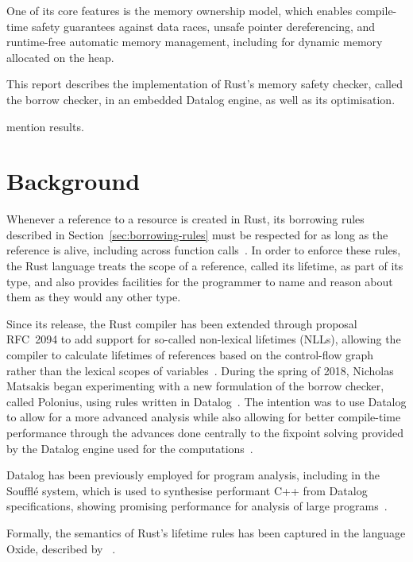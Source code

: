 \documentclass{UUThesisTemplate}
\newcommand{\fixme}[1] {{\color{red}#1}}
\begin{document}
One of its core features is the memory ownership model, which enables
compile-time safety guarantees against data races, unsafe pointer dereferencing,
and runtime-free automatic memory management, including for dynamic memory
allocated on the heap.

This report describes the implementation of Rust's memory safety checker, called
the borrow checker, in an embedded Datalog engine, as well as its optimisation.

\fixme{mention results.}

\chapter{Background}
Whenever a reference to a resource is created in Rust, its borrowing rules
described in Section~\ref{sec:borrowing-rules} must be respected for as long as
the reference is alive, including across function
calls~\cite{nichols_rust_nodate}. In order to enforce these rules, the Rust
language treats the scope of a reference, called its lifetime, as part of its
type, and also provides facilities for the programmer to name and reason about
them as they would any other type.

Since its release, the Rust compiler has been extended through proposal RFC~2094
to add support for so-called non-lexical lifetimes (NLLs), allowing the compiler
to calculate lifetimes of references based on the control-flow graph rather than
the lexical scopes of variables~\cite{noauthor_rfc_2019}. During the spring of
2018, Nicholas Matsakis began experimenting with a new formulation of the borrow
checker, called Polonius, using rules written in
Datalog~\cite{matsakis_alias-based_2018}. The intention was to use Datalog to
allow for a more advanced analysis while also allowing for better compile-time
performance through the advances done centrally to the fixpoint solving provided
by the Datalog engine used for the computations~\cite{datafrog}.

Datalog has been previously employed for program analysis, including in the
Souffl{\'e} system, which is used to synthesise performant C++ from Datalog
specifications, showing promising performance for analysis of large
programs~\cite{scholz_fast_2016}.

Formally, the semantics of Rust's lifetime rules has been captured in the
language Oxide, described by
\citeauthor{weiss_oxide:_2019}~\cite{weiss_oxide:_2019}.

\end{document}
